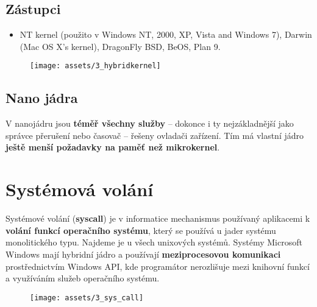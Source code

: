 \subsection*{Zástupci}
\begin{itemize}
    \item NT kernel (použito v Windows NT, 2000, XP, Vista and Windows 7), Darwin (Mac OS X's kernel), DragonFly BSD, BeOS, Plan 9.
\end{itemize}
\begin{figure}[H]
    \centering
    \texttt{[image: assets/3\_hybridkernel]}
\end{figure}

\subsection{Nano jádra}
V nanojádru jsou \textbf{téměř všechny služby} – dokonce i ty nejzákladnější jako správce přerušení nebo časovač – řešeny ovladači zařízení. Tím má vlastní jádro\textbf{ ještě menší požadavky na paměť než mikrokernel}.

\section{Systémová volání}
Systémové volání (\textbf{syscall}) je v informatice mechanismus používaný aplikacemi k \textbf{volání funkcí operačního systému}, který se používá u jader systému monolitického typu. Najdeme je u všech unixových systémů. Systémy Microsoft Windows mají hybridní jádro a používají \textbf{meziprocesovou komunikaci} prostřednictvím Windows API, kde programátor nerozlišuje mezi knihovní funkcí a využíváním služeb operačního systému.

\begin{figure}[H]
    \centering
    \texttt{[image: assets/3\_sys\_call]}
\end{figure}